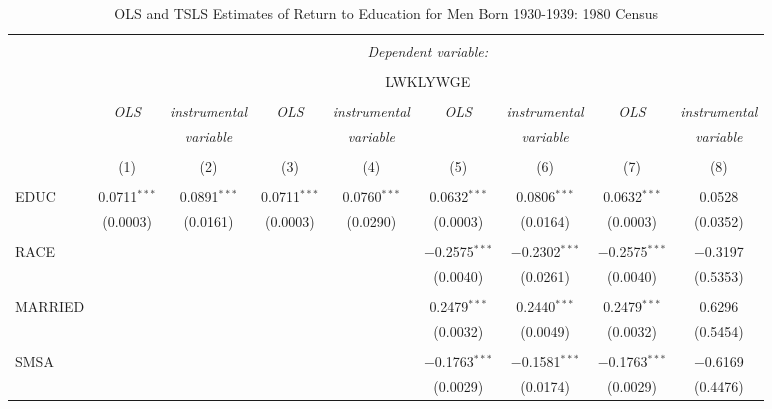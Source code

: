 
\begin{table}[!htbp] \centering 
  \caption{OLS and TSLS Estimates of Return to Education for Men Born 
    1930-1939: 1980 Census} 
  \label{} 
\begin{tabular}{@{\extracolsep{5pt}}lcccccccc} 
\\[-1.8ex]\hline 
\hline \\[-1.8ex] 
 & \multicolumn{8}{c}{\textit{Dependent variable:}} \\ 
\cline{2-9} 
\\[-1.8ex] & \multicolumn{8}{c}{LWKLYWGE} \\ 
\\[-1.8ex] & \textit{OLS} & \textit{instrumental} & \textit{OLS} & \textit{instrumental} & \textit{OLS} & \textit{instrumental} & \textit{OLS} & \textit{instrumental} \\ 
 & \textit{} & \textit{variable} & \textit{} & \textit{variable} & \textit{} & \textit{variable} & \textit{} & \textit{variable} \\ 
\\[-1.8ex] & (1) & (2) & (3) & (4) & (5) & (6) & (7) & (8)\\ 
\hline \\[-1.8ex] 
 EDUC & 0.0711$^{***}$ & 0.0891$^{***}$ & 0.0711$^{***}$ & 0.0760$^{***}$ & 0.0632$^{***}$ & 0.0806$^{***}$ & 0.0632$^{***}$ & 0.0528 \\ 
  & (0.0003) & (0.0161) & (0.0003) & (0.0290) & (0.0003) & (0.0164) & (0.0003) & (0.0352) \\ 
  & & & & & & & & \\ 
 RACE &  &  &  &  & $-$0.2575$^{***}$ & $-$0.2302$^{***}$ & $-$0.2575$^{***}$ & $-$0.3197 \\ 
  &  &  &  &  & (0.0040) & (0.0261) & (0.0040) & (0.5353) \\ 
  & & & & & & & & \\ 
 MARRIED &  &  &  &  & 0.2479$^{***}$ & 0.2440$^{***}$ & 0.2479$^{***}$ & 0.6296 \\ 
  &  &  &  &  & (0.0032) & (0.0049) & (0.0032) & (0.5454) \\ 
  & & & & & & & & \\ 
 SMSA &  &  &  &  & $-$0.1763$^{***}$ & $-$0.1581$^{***}$ & $-$0.1763$^{***}$ & $-$0.6169 \\ 
  &  &  &  &  & (0.0029) & (0.0174) & (0.0029) & (0.4476) \\ 

\end{tabular}
\end{table}
